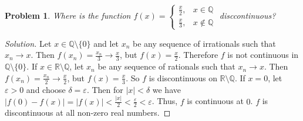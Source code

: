 \documentclass[12pt,oneside]{book}
\theoremstyle{mystyle}
\newtheorem{problem}{Problem}[section]
\begin{document}
\begin{problem}
Where is the function $f(x) = \begin{cases} \frac{x}{2}, & x\in \mathbb{Q} \\ \frac{x}{3}, & x \notin \mathbb{Q}\end{cases}$ disccontinuous?
\end{problem}
\begin{proof}[Solution]
Let $x\in \mathbb{Q}\setminus \{0\}$ and let $x_n$ be any sequence of irrationals such that $x_n \rightarrow x$. Then $f(x_n) = \frac{x_n}{3} \rightarrow \frac{x}{3}$, but $f(x) = \frac{x}{2}$. Therefore $f$ is not continuous in $\mathbb{Q}\setminus \{0\}$. If $x\in \mathbb{R}\setminus \mathbb{Q}$, let $x_n$ be any sequence of rationals such that $x_n \rightarrow x$. Then $f(x_n) = \frac{x_n}{2} \rightarrow \frac{x}{2}$, but $f(x) = \frac{x}{3}$. So $f$ is discontinuous on $\mathbb{R}\setminus \mathbb{Q}$. If $x= 0$, let $\varepsilon>0$ and choose $\delta = \varepsilon$. Then for $|x|<\delta$ we have $|f(0) - f(x)| = |f(x)| < \frac{|x|}{2} < \frac{\varepsilon}{2}<\varepsilon$. Thus, $f$ is continuous at $0$. $f$ is discontinuous at all non-zero real numbers.
\end{proof}
\end{document}
